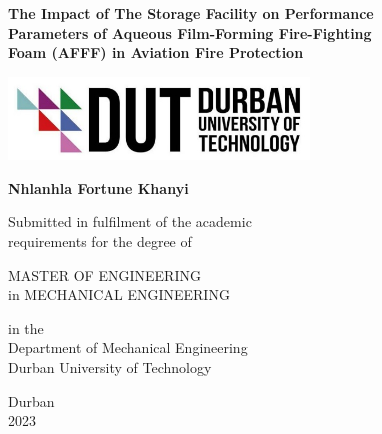 \begin{titlepage}
\begin{center}


\renewcommand{\baselinestretch}{1.2}

{\Large\bf
The Impact of The Storage Facility on Performance\\[6pt] Parameters of Aqueous Film-Forming Fire-Fighting\\[12pt] Foam (AFFF) in Aviation Fire Protection}

\vspace{10mm}

\includegraphics[width=0.6\textwidth]{images/logo.png}

\vskip 10mm

\Large
\textbf{Nhlanhla Fortune Khanyi} \\

\vspace{40mm}

\large
Submitted in fulfilment of the academic\\
requirements for the degree of

\vspace{4mm}

MASTER OF ENGINEERING \\
in MECHANICAL ENGINEERING 

\vspace{4mm}

in the \\
Department of Mechanical Engineering \\
Durban University of Technology



\normalsize
Durban \\
2023

\end{center}
\end{titlepage}
